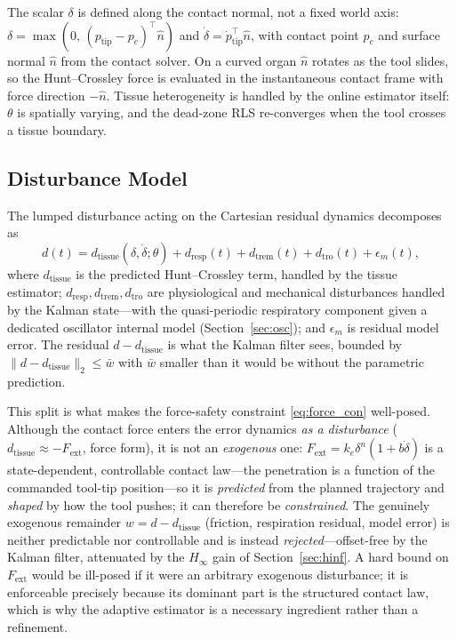 The scalar $\delta$ is defined along the contact normal, not a fixed world axis: $\delta = \max(0,\,(p_{\text{tip}}-p_c)^\top \hat{n})$ and $\dot\delta = \dot{p}_{\text{tip}}^\top\hat{n}$, with contact point $p_c$ and surface normal $\hat{n}$ from the contact solver. On a curved organ $\hat{n}$ rotates as the tool slides, so the Hunt--Crossley force is evaluated in the instantaneous contact frame with force direction $-\hat n$. Tissue heterogeneity is handled by the online estimator itself: $\theta$ is spatially varying, and the dead-zone RLS re-converges when the tool crosses a tissue boundary.

\subsection{Disturbance Model}\label{sec:dist}

The lumped disturbance acting on the Cartesian residual dynamics decomposes as
\begin{equation}
d(t) = d_{\text{tissue}}(\delta, \dot{\delta}; \theta) + d_{\text{resp}}(t) + d_{\text{trem}}(t) + d_{\text{tro}}(t) + \epsilon_m(t),
\label{eq:dist}
\end{equation}
where $d_{\text{tissue}}$ is the predicted Hunt--Crossley term, handled by the tissue estimator; $d_{\text{resp}}, d_{\text{trem}}, d_{\text{tro}}$ are physiological and mechanical disturbances handled by the Kalman state---with the quasi-periodic respiratory component given a dedicated oscillator internal model (Section~\ref{sec:osc}); and $\epsilon_m$ is residual model error. The residual $d - d_{\text{tissue}}$ is what the Kalman filter sees, bounded by $\|d - d_{\text{tissue}}\|_2 \le \bar{w}$ with $\bar w$ smaller than it would be without the parametric prediction.

This split is what makes the force-safety constraint \eqref{eq:force_con} well-posed. Although the contact force enters the error dynamics \emph{as a disturbance} ($d_{\text{tissue}} \approx -F_{\text{ext}}$, force form), it is not an \emph{exogenous} one: $F_{\text{ext}} = k_e\delta^n(1+b\dot\delta)$ is a state-dependent, controllable contact law---the penetration is a function of the commanded tool-tip position---so it is \emph{predicted} from the planned trajectory and \emph{shaped} by how the tool pushes; it can therefore be \emph{constrained}. The genuinely exogenous remainder $w = d - d_{\text{tissue}}$ (friction, respiration residual, model error) is neither predictable nor controllable and is instead \emph{rejected}---offset-free by the Kalman filter, attenuated by the $H_\infty$ gain of Section~\ref{sec:hinf}. A hard bound on $F_{\text{ext}}$ would be ill-posed if it were an arbitrary exogenous disturbance; it is enforceable precisely because its dominant part is the structured contact law, which is why the adaptive estimator is a necessary ingredient rather than a refinement.

